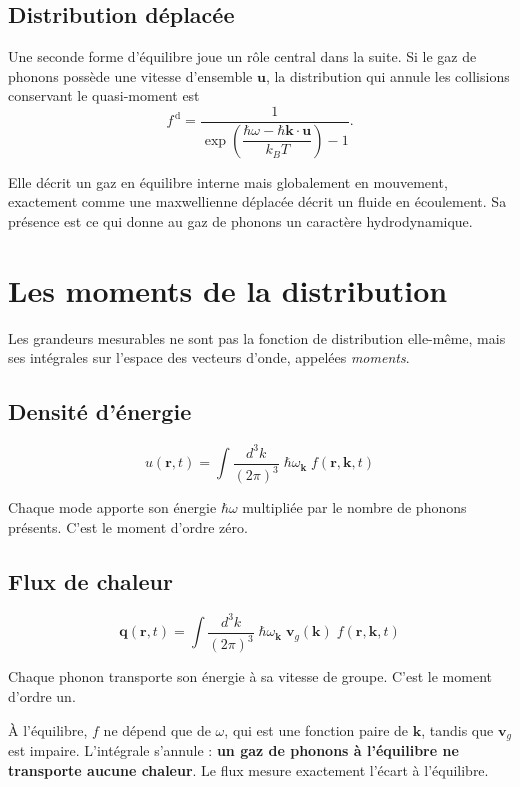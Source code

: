 \documentclass[11pt,a4paper]{article}
\begin{document}
\subsection{Distribution déplacée}

Une seconde forme d'équilibre joue un rôle central dans la suite. Si le gaz de phonons possède une
vitesse d'ensemble $\mathbf{u}$, la distribution qui annule les collisions conservant le
quasi-moment est
\[ f^{\,\mathrm{d}} = \frac{1}{\exp\!\left(\dfrac{\hbar\omega - \hbar\mathbf{k}\cdot\mathbf{u}}{k_B T}\right) - 1} . \]

Elle décrit un gaz en équilibre interne mais globalement en mouvement, exactement comme une
maxwellienne déplacée décrit un fluide en écoulement. Sa présence est ce qui donne au gaz de
phonons un caractère hydrodynamique.

\section{Les moments de la distribution}

Les grandeurs mesurables ne sont pas la fonction de distribution elle-même, mais ses intégrales sur
l'espace des vecteurs d'onde, appelées \emph{moments}.

\subsection{Densité d'énergie}

\[ u(\mathbf{r}, t) = \int \frac{d^3k}{(2\pi)^3}\; \hbar\omega_\mathbf{k}\; f(\mathbf{r}, \mathbf{k}, t) \]

Chaque mode apporte son énergie $\hbar\omega$ multipliée par le nombre de phonons présents. C'est le
moment d'ordre zéro.

\subsection{Flux de chaleur}

\[ \mathbf{q}(\mathbf{r}, t) = \int \frac{d^3k}{(2\pi)^3}\; \hbar\omega_\mathbf{k}\;
\mathbf{v}_g(\mathbf{k})\; f(\mathbf{r}, \mathbf{k}, t) \]

Chaque phonon transporte son énergie à sa vitesse de groupe. C'est le moment d'ordre un.

À l'équilibre, $f$ ne dépend que de $\omega$, qui est une fonction paire de $\mathbf{k}$, tandis que
$\mathbf{v}_g$ est impaire. L'intégrale s'annule : \textbf{un gaz de phonons à l'équilibre ne
transporte aucune chaleur}. Le flux mesure exactement l'écart à l'équilibre.
\end{document}
